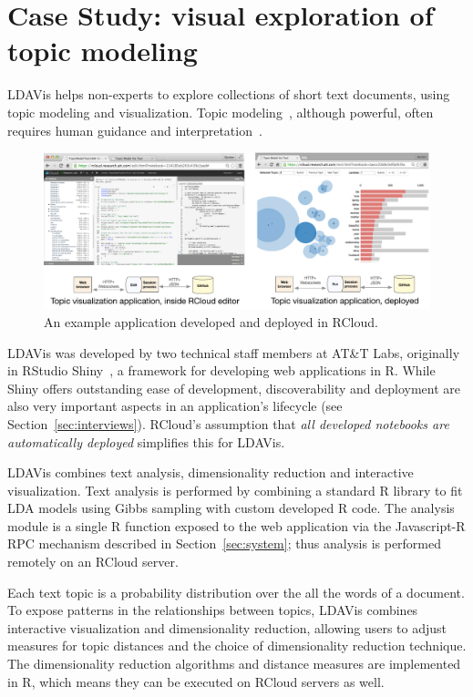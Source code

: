 \section{Case Study\label{sec:casestudy}: visual exploration of topic modeling}

LDAVis helps non-experts to explore collections of
short text documents, using topic modeling and
visualization. Topic modeling~\cite{Blei:2003:LDA},
although powerful, often requires human guidance
and interpretation~\cite{Sievert:2014:LAM}.

\begin{figure}
  \includegraphics[width=\linewidth]{fig/casestudytext/casestudytext.pdf}
  \caption{\label{fig:textvis}An example application developed and deployed in RCloud.}
\end{figure}

LDAVis was developed by two technical staff members at
AT\&T Labs, originally in RStudio Shiny~\cite{RStudio:2013:SWA},
a framework for developing web applications in R.
While Shiny offers outstanding ease of development,
discoverability and deployment are also very important aspects
in an application's lifecycle (see Section~\ref{sec:interviews}).
RCloud's assumption that \emph{all developed notebooks are automatically
deployed} simplifies this for LDAVis.

LDAVis combines text analysis, dimensionality reduction and
interactive visualization. Text analysis is performed by
combining a standard R library to fit LDA models using
Gibbs sampling with custom developed R code.
The analysis module is a single R function
exposed to the web application via the Javascript-R RPC
mechanism described in Section~\ref{sec:system};
thus analysis is performed remotely on an RCloud server.

Each text topic is a probability distribution over the all the
words of a document. To expose patterns in the relationships
between topics, LDAVis combines
interactive visualization and dimensionality reduction,
allowing users to adjust measures for topic distances and the choice
of dimensionality reduction technique. The dimensionality reduction
algorithms and distance measures are implemented in R, which
means they can be executed on RCloud servers as well.

